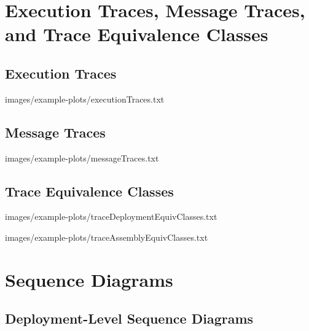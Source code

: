 \section{Execution Traces, Message Traces, and Trace Equivalence Classes}

\subsection{Execution Traces}

\setTextListing
%
{images/example-plots/executionTraces.txt}

\subsection{Message Traces}

\setTextListing
%
{images/example-plots/messageTraces.txt}

\subsection{Trace Equivalence Classes}

\setTextListing

{images/example-plots/traceDeploymentEquivClasses.txt}

\setTextListing
%
{images/example-plots/traceAssemblyEquivClasses.txt}

\section{Sequence Diagrams}

\subsection{Deployment-Level Sequence Diagrams}

